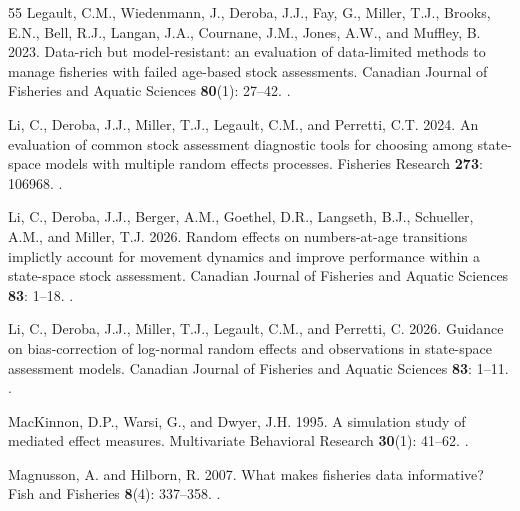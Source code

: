 \documentclass[
  12pt,
]{article}
\begin{document}
\begin{thebibliography}{55}
Legault, C.M., Wiedenmann, J., Deroba, J.J., Fay, G., Miller, T.J., Brooks, E.N., Bell, R.J., Langan, J.A., Cournane, J.M., Jones, A.W., and Muffley, B. 2023.
\newblock Data-rich but model-resistant: an evaluation of data-limited methods to manage fisheries with failed age-based stock assessments.
\newblock Canadian Journal of Fisheries and Aquatic Sciences \textbf{80}(1): 27--42.
\newblock {}.

Li, C., Deroba, J.J., Miller, T.J., Legault, C.M., and Perretti, C.T. 2024.
\newblock An evaluation of common stock assessment diagnostic tools for choosing among state-space models with multiple random effects processes.
\newblock Fisheries Research \textbf{273}: 106968.
\newblock {}.

Li, C., Deroba, J.J., Berger, A.M., Goethel, D.R., Langseth, B.J., Schueller, A.M., and Miller, T.J. 2026{}.
\newblock Random effects on numbers-at-age transitions implictly account for movement dynamics and improve performance within a state-space stock assessment.
\newblock Canadian Journal of Fisheries and Aquatic Sciences \textbf{83}: 1--18.
\newblock {}.

Li, C., Deroba, J.J., Miller, T.J., Legault, C.M., and Perretti, C. 2026{}.
\newblock Guidance on bias-correction of log-normal random effects and observations in state-space assessment models.
\newblock Canadian Journal of Fisheries and Aquatic Sciences \textbf{83}: 1--11.
\newblock {}.

MacKinnon, D.P., Warsi, G., and Dwyer, J.H. 1995.
\newblock A simulation study of mediated effect measures.
\newblock Multivariate Behavioral Research \textbf{30}(1): 41--62.
\newblock {}.

Magnusson, A. and Hilborn, R. 2007.
\newblock What makes fisheries data informative?
\newblock Fish and Fisheries \textbf{8}(4): 337--358.
\newblock {}.


\end{thebibliography}
\end{document}
